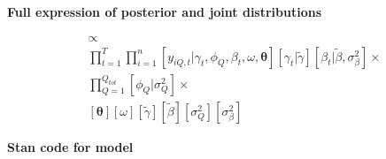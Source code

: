 \documentclass[12pt,]{article}
\begin{document}
\textbf{Full expression of posterior and joint distributions}

\begin{align}
[\boldsymbol{\gamma}, \tilde{\gamma}, \boldsymbol{\phi}, \boldsymbol{\beta}, \tilde{\beta}, \omega, \boldsymbol{\theta}, \sigma_Q^2, \sigma_\beta^2] &\propto \\
&\prod_{t=1}^T \prod_{i=1}^n [y_{iQ,t} | \gamma_{t}, \phi_{Q}, \beta_{t}, \omega, \boldsymbol{\theta}] [\gamma_{t} | \tilde{\gamma}] [\beta_{t} | \tilde{\beta}, \sigma_\beta^2] \times \\
&\prod_{Q=1}^{Q_{tot}} [\phi_{Q} | \sigma_Q^2] \times \\
&[\boldsymbol{\theta}] [\omega] [\tilde{\gamma}] [\tilde{\beta}] [\sigma_Q^2] [\sigma_\beta^2]
\end{align}

\textbf{Stan code for model}
\end{document}
